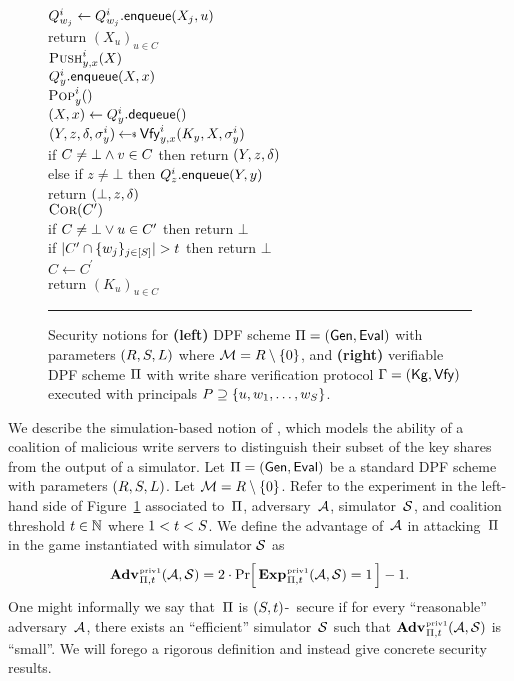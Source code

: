 \begin{figure}[t]
{    \\
    \ind $Q_{w_j}^i \gets Q_{w_j}^i.\mathsf{enqueue}(X_j, u)$\\
    return $(X_u)_{u\in C}$
    \\[6pt]
    \underline{$\textsc{Push}_{y,x}^i(X)$}\\[2pt]
      $Q_y^i.\mathsf{enqueue}(X, x)$
    \\[6pt]
    \underline{$\textsc{Pop}_{y}^i()$}\\[2pt]
      $(X, x) \gets Q_y^i.\mathsf{dequeue}()$\\
      $(Y, z, \verdict, \st_y^i) \getsr \vfy_{y,x}^i(K_y, X, \st_y^i)$\\
      if $C \ne \bot \wedge v \in C$ then return $(Y, z, \delta)$\\
      else if $z \ne \bot$ then $Q_z^i.\mathsf{enqueue}(Y, y)$\\
      return $(\bot, z, \delta)$
    \\[6pt]
    \underline{$\textsc{Cor}(C^\prime)$}\\[2pt]
    if $C \ne \bot \vee u \in C^\prime$ then return $\bot$\\
    if $|C^\prime \cap \{w_j\}_{j\in[S]}| > t$ then return $\bot$\\
    $C \gets C^\prime$\\
    return $(K_u)_{u\in C}$
  }
  \caption{Security notions for \textbf{(left)} DPF scheme $\mathrm{\Pi} = (\mathsf{Gen},
  \mathsf{Eval})$ with parameters $(R, S, L)$ where $\mathcal{M} = R
  \setminus \{0\}$, and
  \textbf{(right)} verifiable DPF scheme $\mathrm{\Pi}$ with write share verification
  protocol $\mathrm{\Gamma} = (\mathsf{Kg}, \mathsf{Vfy})$ executed with principals $P \supseteq \{u, w_1,
  \ldots, w_S\}$.}
  \vspace{6pt}\hrule
  \label{fig-priv}
\end{figure}

We describe the simulation-based notion of \cite{riposte,dpf}, which models the
ability of a coalition of malicious write servers to distinguish their subset of
the key shares from the output of a simulator. Let $\mathrm{\Pi} = (\mathsf{Gen}, \mathsf{Eval})$ be a
standard DPF scheme with parameters $(R, S, L)$. Let $\mathcal{M} = R
\setminus \{0\}$. Refer to the experiment in the left-hand side of
Figure~\ref{fig-priv} associated to~$\mathrm{\Pi}$, adversary~$\mathcal{A}$,
simulator~$\mathcal{S}$, and coalition threshold $t \in \mathbb{N}$ where $1 < t < S$.
We define the advantage of~$\mathcal{A}$ in attacking~$\mathrm{\Pi}$ in the game instantiated
with simulator $\mathcal{S}$ as
\[
  \adv{\privone}_{\dpf,t}(\advA,\advS) = 2 \cdot
  \Prob{ \game{\privone}_{\dpf,t}(\advA,\advS) \outputs \true } - 1.
\]
One might informally we say that~$\mathrm{\Pi}$ is $(S,t)$-\privone~secure if for
every ``reasonable'' adversary~$\mathcal{A}$, there exists an ``efficient''
simulator~$\mathcal{S}$ such that $\adv{\privone}_{\dpf,t}(\advA,\advS)$ is ``small''.
We will forego a rigorous definition and instead give concrete security results.

